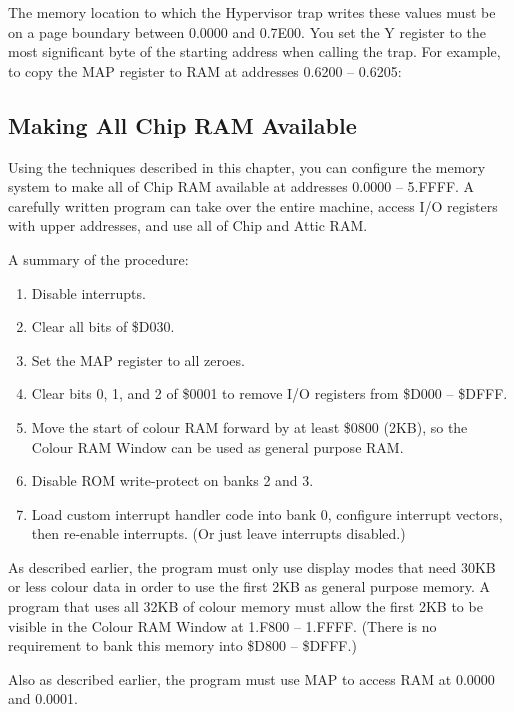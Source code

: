 The memory location to which the Hypervisor trap writes these values must be
on a page boundary between 0.0000 and 0.7E00. You set the Y register to the
most significant byte of the starting address when calling the trap. For
example, to copy the MAP register to RAM at addresses 0.6200 -- 0.6205:


\subsection{Making All Chip RAM Available}

Using the techniques described in this chapter, you can configure the memory
system to make all of Chip RAM available at addresses 0.0000 -- 5.FFFF. A
carefully written program can take over the entire machine, access I/O
registers with upper addresses, and use all of Chip and Attic RAM.

A summary of the procedure:

\begin{enumerate}
\item Disable interrupts.
\item Clear all bits of \$D030.
\item Set the MAP register to all zeroes.
\item Clear bits 0, 1, and 2 of \$0001 to remove I/O registers from \$D000 -- \$DFFF.
\item Move the start of colour RAM forward by at least \$0800 (2KB), so the
Colour RAM Window can be used as general purpose RAM.
\item Disable ROM write-protect on banks 2 and 3.
\item Load custom interrupt handler code into bank 0, configure interrupt
vectors, then re-enable interrupts. (Or just leave interrupts disabled.)
\end{enumerate}

As described earlier, the program must only use display modes that need 30KB or
less colour data in order to use the first 2KB as general purpose memory. A
program that uses all 32KB of colour memory must allow the first 2KB to be
visible in the Colour RAM Window at 1.F800 -- 1.FFFF. (There is no requirement
to bank this memory into \$D800 -- \$DFFF.)

Also as described earlier, the program must use MAP to access RAM at 0.0000
and 0.0001.

